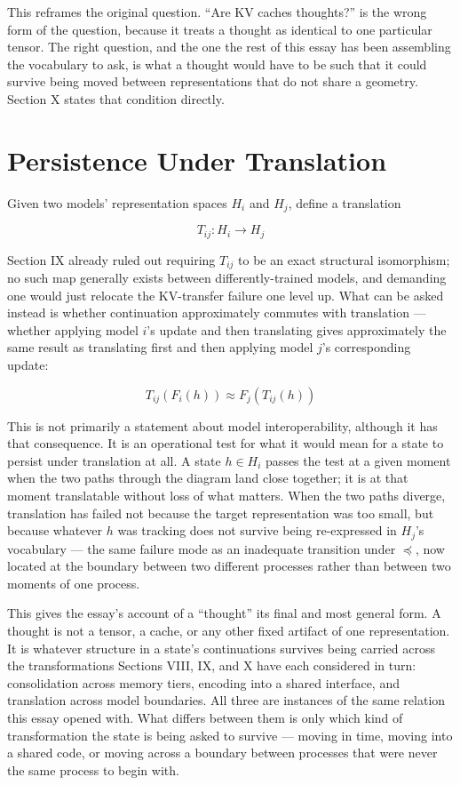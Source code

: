 \documentclass[11pt]{article}
\begin{document}
This reframes the original question. ``Are KV caches thoughts?'' is the wrong form of the question, because it treats a thought as identical to one particular tensor. The right question, and the one the rest of this essay has been assembling the vocabulary to ask, is what a thought would have to be such that it could survive being moved between representations that do not share a geometry. Section X states that condition directly.

\section{Persistence Under Translation}

Given two models' representation spaces $H_i$ and $H_j$, define a translation

\[
T_{ij} : H_i \to H_j
\]

Section IX already ruled out requiring $T_{ij}$ to be an exact structural isomorphism; no such map generally exists between differently-trained models, and demanding one would just relocate the KV-transfer failure one level up. What can be asked instead is whether continuation approximately commutes with translation --- whether applying model $i$'s update and then translating gives approximately the same result as translating first and then applying model $j$'s corresponding update:

\[
T_{ij}(F_i(h)) \approx F_j(T_{ij}(h))
\]

This is not primarily a statement about model interoperability, although it has that consequence. It is an operational test for what it would mean for a state to persist under translation at all. A state $h \in H_i$ passes the test at a given moment when the two paths through the diagram land close together; it is at that moment translatable without loss of what matters. When the two paths diverge, translation has failed not because the target representation was too small, but because whatever $h$ was tracking does not survive being re-expressed in $H_j$'s vocabulary --- the same failure mode as an inadequate transition under $\preceq$, now located at the boundary between two different processes rather than between two moments of one process.

This gives the essay's account of a ``thought'' its final and most general form. A thought is not a tensor, a cache, or any other fixed artifact of one representation. It is whatever structure in a state's continuations survives being carried across the transformations Sections VIII, IX, and X have each considered in turn: consolidation across memory tiers, encoding into a shared interface, and translation across model boundaries. All three are instances of the same relation this essay opened with. What differs between them is only which kind of transformation the state is being asked to survive --- moving in time, moving into a shared code, or moving across a boundary between processes that were never the same process to begin with.
\end{document}
